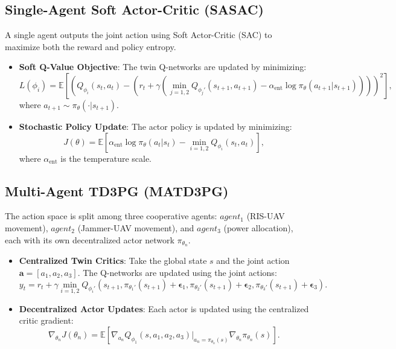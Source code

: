 \documentclass[journal,onecolumn]{IEEEtran}
\begin{document}
\subsection{Single-Agent Soft Actor-Critic (SASAC)}
A single agent outputs the joint action using Soft Actor-Critic (SAC) to maximize both the reward and policy entropy.
\begin{itemize}
    \item \textbf{Soft Q-Value Objective}: The twin Q-networks are updated by minimizing:
    \begin{equation}
        L(\phi_i) = \mathbb{E}\left[ \left( Q_{\phi_i}(s_t, a_t) - \left( r_t + \gamma \left( \min_{j=1,2} Q_{\phi_j'}(s_{t+1}, a_{t+1}) - \alpha_{\text{ent}} \log \pi_\theta(a_{t+1}|s_{t+1}) \right) \right) \right)^2 \right],
    \end{equation}
    where $a_{t+1} \sim \pi_{\theta}(\cdot|s_{t+1})$.
    \item \textbf{Stochastic Policy Update}: The actor policy is updated by minimizing:
    \begin{equation}
        J(\theta) = \mathbb{E}\left[ \alpha_{\text{ent}} \log \pi_{\theta}(a_t|s_t) - \min_{i=1,2} Q_{\phi_i}(s_t, a_t) \right],
    \end{equation}
    where $\alpha_{\text{ent}}$ is the temperature scale.
\end{itemize}

\subsection{Multi-Agent TD3PG (MATD3PG)}
The action space is split among three cooperative agents: $agent_1$ (RIS-UAV movement), $agent_2$ (Jammer-UAV movement), and $agent_3$ (power allocation), each with its own decentralized actor network $\pi_{\theta_n}$.
\begin{itemize}
    \item \textbf{Centralized Twin Critics}: Take the global state $s$ and the joint action $\mathbf{a} = [a_1, a_2, a_3]$. The Q-networks are updated using the joint actions:
    \begin{equation}
        y_t = r_t + \gamma \min_{i=1,2} Q_{\phi_i'}\left( s_{t+1}, \pi_{\theta_1'}(s_{t+1}) + \bm{\epsilon}_1, \pi_{\theta_2'}(s_{t+1}) + \bm{\epsilon}_2, \pi_{\theta_3'}(s_{t+1}) + \bm{\epsilon}_3 \right).
    \end{equation}
    \item \textbf{Decentralized Actor Updates}: Each actor is updated using the centralized critic gradient:
    \begin{equation}
        \nabla_{\theta_n} J(\theta_n) = \mathbb{E}\left[ \nabla_{a_n} Q_{\phi_1}(s, a_1, a_2, a_3)|_{a_n=\pi_{\theta_n}(s)} \nabla_{\theta_n} \pi_{\theta_n}(s) \right].
    \end{equation}
\end{itemize}
\end{document}
